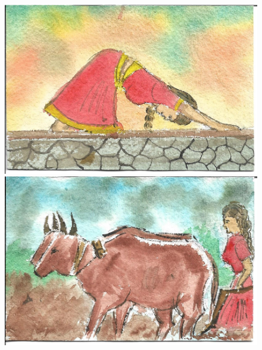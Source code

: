 \documentclass[12pt]{article}
\begin{document}
\begin{figure}[h!]
\includegraphics[width=.331\paperwidth]{pictures/AE}
\hspace*{1cm}\includegraphics[width=.331\paperwidth]{pictures/AP}
\end{figure}

\newpage
\end{document}
